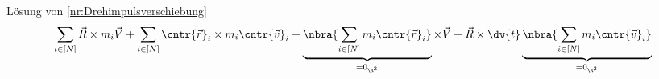 \documentclass{subfiles}
\begin{document}
	Lösung von \eqref{nr:Drehimpulsverschiebung}
	$$\sum_{i\in[N]}\vec{R}\times m_i\vec{V}+\sum_{i\in[N]}\cntr{\vec{r}}_i\times m_i\cntr{\vec{v}}_i+\underbrace{\nbra{\sum_{i\in[N]}m_i\cntr{\vec{r}}_i}}_{=0_{\R^3}}\times\vec{V}+\vec{R}\times\dv{t}\underbrace{\nbra{\sum_{i\in[N]}m_i\cntr{\vec{v}}_i}}_{=0_{\R^3}}$$
\end{document}
